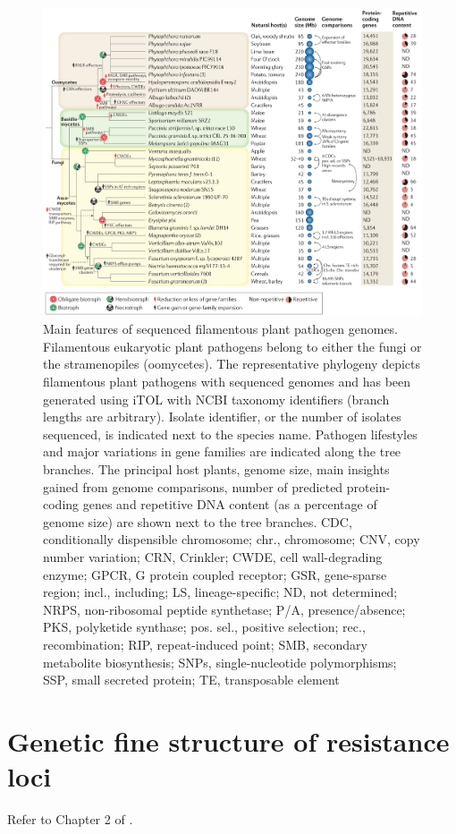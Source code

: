 \documentclass[11pt,dvipsnames,ignorenonframetext,aspectratio=169]{beamer}
\begin{document}
\begin{frame}{}
\protect\hypertarget{section-20}{}
\begin{figure}
\includegraphics[width=0.4\linewidth]{../images/genome_comparison_pathogenic_fungi} \caption{Main features of sequenced filamentous plant pathogen genomes. Filamentous eukaryotic plant pathogens belong to either the fungi or the stramenopiles (oomycetes). The representative phylogeny depicts filamentous plant pathogens with sequenced genomes and has been generated using iTOL with NCBI taxonomy identifiers (branch lengths are arbitrary). Isolate identifier, or the number of isolates sequenced, is indicated next to the species name. Pathogen lifestyles and major variations in gene families are indicated along the tree branches. The principal host plants, genome size, main insights gained from genome comparisons, number of predicted protein-coding genes and repetitive DNA content (as a percentage of genome size) are shown next to the tree branches. CDC, conditionally dispensible chromosome; chr., chromosome; CNV, copy number variation; CRN, Crinkler; CWDE, cell wall-degrading enzyme; GPCR, G protein coupled receptor; GSR, gene-sparse region; incl., including; LS, lineage-specific; ND, not determined; NRPS, non-ribosomal peptide synthetase; P/A, presence/absence; PKS, polyketide synthase; pos. sel., positive selection; rec., recombination; RIP, repeat-induced point; SMB, secondary metabolite biosynthesis; SNPs, single-nucleotide polymorphisms; SSP, small secreted protein; TE, transposable element}\label{fig:pathogenic-fungi-genome-compare}
\end{figure}
\end{frame}

\hypertarget{genetic-fine-structure-of-resistance-loci}{%
\section{Genetic fine structure of resistance
loci}\label{genetic-fine-structure-of-resistance-loci}}

\begin{frame}{}
\protect\hypertarget{section-21}{}
Refer to Chapter 2 of \citet{hulbert1997genetic}.
\end{frame}
\end{document}
